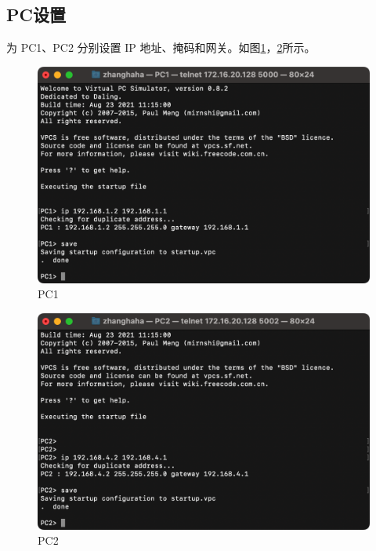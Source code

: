 \documentclass[a4paper,12pt]{report}
\begin{document}
\begin{spacing}{1.5}
\subsection{PC设置}
为 PC1、PC2 分别设置 IP 地址、掩码和网关。如图\ref{2}，\ref{3}所示。
\begin{figure}[htb!]
  \centering
\includegraphics[width=12cm]{figure/PC1.png}
\caption{PC1}
\label{2}
\end{figure}

\begin{figure}[htb!]
  \centering
\includegraphics[width=12cm]{figure/PC2.png}
\caption{PC2}
\label{3}
\end{figure}


\end{spacing}
\end{document}
